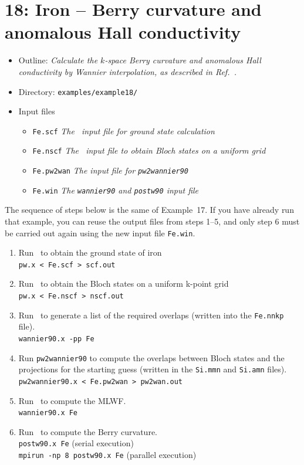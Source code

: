 \documentclass[a4paper,11pt,twoside]{article}
\begin{document}
\cleardoublepage

\section*{18: Iron -- Berry curvature and anomalous Hall 
conductivity}

\begin{itemize}
\item{Outline: \it{Calculate the $k$-space Berry curvature and
      anomalous Hall conductivity by Wannier interpolation, as
      described in Ref.~\cite{wang-prb06}.}}
\item{Directory: {\tt examples/example18/}}
\item{Input files}
\begin{itemize}
\item{ {\tt Fe.scf} {\it The \pwscf\ input file for ground state
    calculation}}
\item{ {\tt Fe.nscf}  {\it The \pwscf\ input file to obtain Bloch
    states on a uniform grid}} 
\item{ {\tt Fe.pw2wan}  {\it The input file for {\tt pw2wannier90}}}
\item{ {\tt Fe.win}  {\it The {\tt wannier90} and {\tt postw90} input file}}
\end{itemize}
\end{itemize}

The sequence of steps below is the same of Example~17.  If you have
already run that example, you can reuse the output files from steps
1--5, and only step 6 must be carried out again using the new input
file {\tt Fe.win}.

\begin{enumerate}
\item Run \pwscf\ to obtain the ground state of iron\\
{\tt pw.x < Fe.scf > scf.out}

\item Run \pwscf\ to obtain the Bloch states on a uniform k-point
  grid\\ 
{\tt pw.x < Fe.nscf > nscf.out}

\item Run \wannier\ to generate a list of the required overlaps (written
  into the {\tt Fe.nnkp} file).\\
{\tt wannier90.x -pp Fe}

\item Run {\tt pw2wannier90} to compute the overlaps between Bloch
  states and the projections for the starting guess (written in the
  {\tt Si.mmn} and {\tt  Si.amn} files).\\
{\tt pw2wannier90.x < Fe.pw2wan > pw2wan.out}

\item Run \wannier\ to compute the MLWF.\\
{\tt wannier90.x Fe}

\item Run \postw\ to compute the Berry curvature.\\
  {\tt postw90.x Fe} (serial execution)\\
  {\tt mpirun -np 8 postw90.x Fe} (parallel execution)


\end{enumerate}
\end{document}

